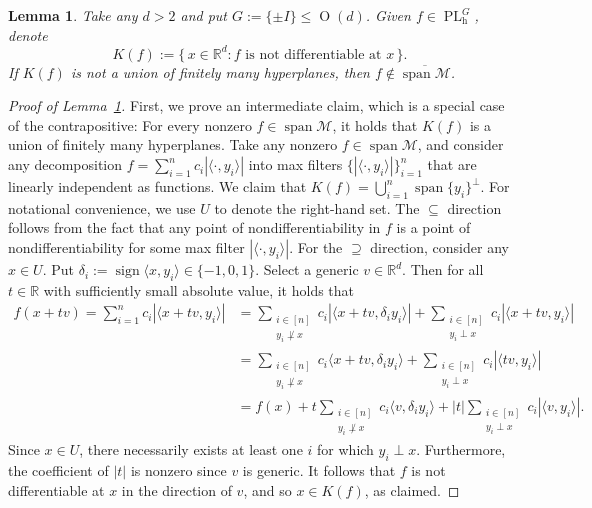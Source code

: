 \documentclass[10pt,a4paper]{amsart}
\newtheorem{lemma}{Lemma}
\begin{document}
\begin{lemma}
\label{lem.ksl}
Take any $d>2$ and put $G := \{ \pm  I \} \leq \operatorname{O}(d)$.
Given $f\in\operatorname{PL}_{\operatorname{h}}^G$, denote
\[
K(f)
:=\{\,x \in \mathbb{R}^d : \text{$f$ is not differentiable at $x$}\,\}.
\]
If $K(f)$ is not a union of finitely many hyperplanes, then $f \notin \overline{\operatorname{span}\mathcal{M}}$.
\end{lemma}

\begin{proof}[Proof of Lemma~\ref{lem.ksl}]
First, we prove an intermediate claim, which is a special case of the contrapositive:
For every nonzero $f\in\operatorname{span}\mathcal{M}$, it holds that $K(f)$ is a union of finitely many hyperplanes.
Take any nonzero $f\in\operatorname{span}\mathcal{M}$, and consider any decomposition $f=\sum_{i=1}^n c_i|\langle\cdot,y_i\rangle|$ into max filters $\{|\langle\cdot,y_i\rangle|\}_{i=1}^n$ that are linearly independent as functions.
We claim that $K(f)=\bigcup_{i=1}^n\operatorname{span}\{y_i\}^\perp$.
For notational convenience, we use $U$ to denote the right-hand set.
The $\subseteq$ direction follows from the fact that any point of nondifferentiability in $f$ is a point of nondifferentiability for some max filter $|\langle\cdot,y_i\rangle|$.
For the $\supseteq$ direction, consider any $x\in U$.
Put $\delta_i:=\operatorname{sign}\langle x,y_i\rangle\in\{-1,0,1\}$.
Select a generic $v\in\mathbb{R}^d$.
Then for all $t\in\mathbb{R}$ with sufficiently small absolute value, it holds that
\begin{align*}
f(x+tv) 
= \sum_{i=1}^n c_i|\langle x+tv,y_i\rangle|
&= \sum_{\substack{i\in[n]\\[1 pt]y_i\not\perp x}} c_i|\langle x+tv,\delta_iy_i\rangle|+\sum_{\substack{i\in [n]\\[1 pt]y_i\perp x}} c_i|\langle x+tv,y_i\rangle|\\
&= \sum_{\substack{i\in[n]\\[1 pt]y_i\not\perp x}} c_i\langle x+tv,\delta_iy_i\rangle+\sum_{\substack{i\in[n]\\[1 pt]y_i\perp x}} c_i|\langle tv,y_i\rangle|\\
&=f(x)+t\sum_{\substack{i\in[n]\\[1 pt]y_i\not\perp x}} c_i\langle v,\delta_iy_i\rangle+|t|\sum_{\substack{i\in[n]\\[1 pt]y_i\perp x}} c_i|\langle v,y_i\rangle|.
\end{align*}
Since $x\in U$, there necessarily exists at least one $i$ for which $y_i\perp x$.
Furthermore, the coefficient of $|t|$ is nonzero since $v$ is generic.
It follows that $f$ is not differentiable at $x$ in the direction of $v$, and so $x\in K(f)$, as claimed.


\end{proof}
\end{document}

